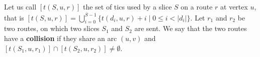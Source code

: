 \documentclass[10pt]{article}
\begin{document}
     
       Let us call $[t(S,u,r)]$ the set of tics used by a slice $S$ on a route $r$ at vertex $u$, that is $[t(S,u,r)] =  \bigcup_{i=0}^{\overline S -1} \{t(d_i,u,r) + i \mid 0 \leq i < |d_i|\}$.
      Let $r_1$ and $r_2$ be two routes, on which two slices $S_1$ and $S_2$ are sent.
      We say that the two routes have a {\bf collision} if they share an arc $(u,v)$ and $[t(S_1,u,r_{1})] \cap [t(S_2,u,r_{2})] \neq \emptyset$.
      
	 
\end{document}

